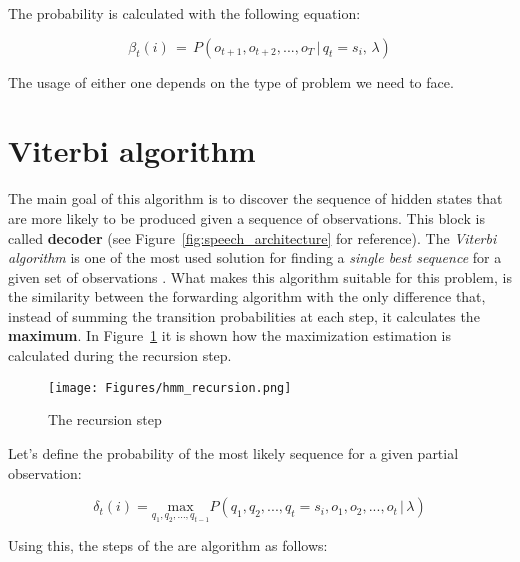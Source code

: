\noindent The probability is calculated with the following equation:

\begin{equation}
\label{eq:backward_algorithm}
	\beta_{t}(i) \, = \, P(o_{t+1}, o_{t+2}, ... , o_{T} \, | \, q_{t} = s_{i}, \, \lambda)
\end{equation}

\noindent The usage of either one depends on the type of problem we need to face.


\section{Viterbi algorithm}
\label{sec:viterbi}
The main goal of this algorithm is to discover the sequence of hidden states that are more likely to be produced given a sequence of observations. This block is called \textbf{decoder} (see Figure~\ref{fig:speech_architecture} for reference). The \textit{Viterbi algorithm} is one of the most used solution for finding a \textit{single best sequence} for a given set of observations \cite{hmm_tutorial}. What makes this algorithm suitable for this problem, is the similarity between the forwarding algorithm with the only difference that, instead of summing the transition probabilities at each step, it calculates the \textbf{maximum}. In Figure~\ref{fig:hmm_recursion} it is shown how the maximization estimation is calculated during the recursion step.

\begin{figure}[!ht]
	\centering
	\texttt{[image: Figures/hmm\_recursion.png]}
	\caption{The recursion step \cite{hmm_tutorial}}
	\label{fig:hmm_recursion}
\end{figure}

\noindent Let's define the probability of the most likely sequence for a given partial observation:

\begin{equation}
	\delta_{t}(i) =  \underset{q_{1},q_{2}, ... , q_{t-1}}{\mathrm{max}} P (q_{1},q_{2}, ... , q_{t} = s_{i}, o_{1}, o_{2}, ... , o_{t} \, | \, \lambda)
\end{equation}

\noindent Using this, the steps of the are algorithm as follows:

